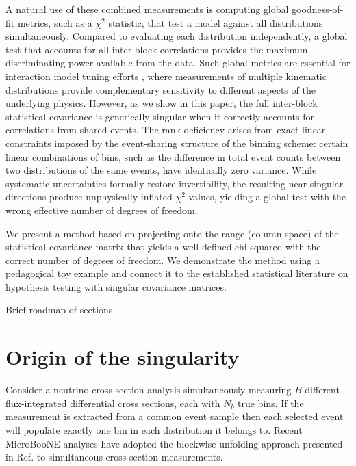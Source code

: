 \documentclass[aps,prd,twocolumn,showpacs,superscriptaddress,floatfix]{revtex4-2}
\begin{document}
A natural use of these combined measurements is computing global goodness-of-fit metrics, such as a $\chi^{2}$ statistic, that test a model against all distributions simultaneously. Compared to evaluating each distribution independently, a global test that accounts for all inter-block correlations provides the maximum discriminating power available from the data. Such global metrics are essential for interaction model tuning efforts \cite{Wilkinson:2016wmz,MINERvA:2019kfr,GENIE:2022qrc}, where measurements of multiple kinematic distributions provide complementary sensitivity to different aspects of the underlying physics. However, as we show in this paper, the full inter-block statistical covariance is generically singular when it correctly accounts for correlations from shared events. The rank deficiency arises from exact linear constraints imposed by the event-sharing structure of the binning scheme: certain linear combinations of bins, such as the difference in total event counts between two distributions of the same events, have identically zero variance. While systematic uncertainties formally restore invertibility, the resulting near-singular directions produce unphysically inflated $\chi^{2}$ values, yielding a global test with the wrong effective number of degrees of freedom.

We present a method based on projecting onto the range (column space) of the statistical covariance matrix that yields a well-defined chi-squared with the correct number of degrees of freedom. We demonstrate the method using a pedagogical toy example and connect it to the established statistical literature on hypothesis testing with singular covariance matrices.

Brief roadmap of sections.

\section{Origin of the singularity}

Consider a neutrino cross-section analysis simultaneously measuring $B$ different flux-integrated differential cross sections, each with $N_b$ true bins. If the measurement is extracted from a common event sample then each selected event will populate exactly one bin in each distribution it belongs to. Recent MicroBooNE analyses \cite{MicroBooNE:2024yzp} have adopted the blockwise unfolding approach presented in Ref. \cite{Gardiner:2024gdy} to simultaneous cross-section measurements.
\end{document}
